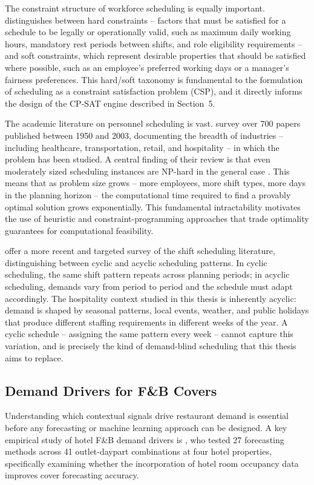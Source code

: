 \documentclass[12pt,a4paper,oneside]{article}
\begin{document}
The constraint structure of workforce scheduling is equally important. \citet{thompson2004} distinguishes between hard constraints -- factors that must be satisfied for a schedule to be legally or operationally valid, such as maximum daily working hours, mandatory rest periods between shifts, and role eligibility requirements -- and soft constraints, which represent desirable properties that should be satisfied where possible, such as an employee's preferred working days or a manager's fairness preferences. This hard/soft taxonomy is fundamental to the formulation of scheduling as a constraint satisfaction problem (CSP), and it directly informs the design of the CP-SAT engine described in Section~5.

The academic literature on personnel scheduling is vast. \citet{ernst2004} survey over 700 papers published between 1950 and 2003, documenting the breadth of industries -- including healthcare, transportation, retail, and hospitality -- in which the problem has been studied. A central finding of their review is that even moderately sized scheduling instances are NP-hard in the general case \citep{ernst2004}. This means that as problem size grows -- more employees, more shift types, more days in the planning horizon -- the computational time required to find a provably optimal solution grows exponentially. This fundamental intractability motivates the use of heuristic and constraint-programming approaches that trade optimality guarantees for computational feasibility.

\citet{bergh2013} offer a more recent and targeted survey of the shift scheduling literature, distinguishing between cyclic and acyclic scheduling patterns. In cyclic scheduling, the same shift pattern repeats across planning periods; in acyclic scheduling, demands vary from period to period and the schedule must adapt accordingly. The hospitality context studied in this thesis is inherently acyclic: demand is shaped by seasonal patterns, local events, weather, and public holidays that produce different staffing requirements in different weeks of the year. A cyclic schedule -- assigning the same pattern every week -- cannot capture this variation, and is precisely the kind of demand-blind scheduling that this thesis aims to replace.

\subsection{Demand Drivers for F\&B Covers}

Understanding which contextual signals drive restaurant demand is essential before any forecasting or machine learning approach can be designed. A key empirical study of hotel F\&B demand drivers is \citet{thompson2008}, who tested 27 forecasting methods across 41 outlet-daypart combinations at four hotel properties, specifically examining whether the incorporation of hotel room occupancy data improves cover forecasting accuracy.
\end{document}
